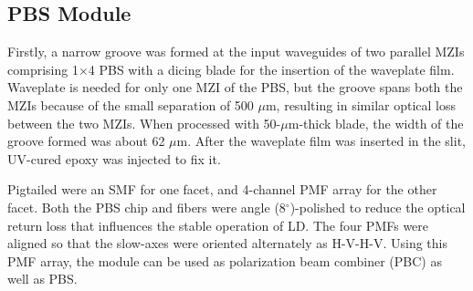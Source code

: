 \documentclass[letterpaper, 10pt]{article}
\begin{document}
\subsection{PBS Module}

Firstly, a narrow groove was formed at the input waveguides of two parallel MZIs comprising 1$\times$4 PBS with a dicing blade for the insertion of the waveplate film.
Waveplate is needed for only one MZI of the PBS, but the groove spans  both the MZIs because of the small separation of 500 $\mu$m, resulting in similar optical loss between the two MZIs.
When processed with 50-$\mu$m-thick blade, the width of the groove formed was about 62 $\mu$m.
After the waveplate film was inserted in the slit, UV-cured epoxy was injected to fix it.

Pigtailed were an SMF for one facet, and 4-channel PMF array for the other facet.
Both the PBS chip and fibers were angle (8$^\circ$)-polished to reduce the optical return loss that influences the stable operation of LD.
The four PMFs were aligned so that the slow-axes  were oriented alternately as H-V-H-V.
Using this PMF array, the module can be used as polarization beam combiner (PBC) as well as PBS.
\end{document}
